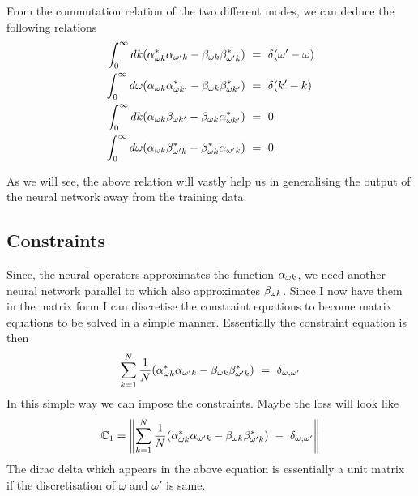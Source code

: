 
From the commutation relation of the two different modes, we can deduce the following relations
\begin{equation}\label{eq:constraints}
    \begin{aligned}
        \int_0^{\infty}dk (\alpha_{\omega k}^*\alpha_{\omega'k}-\beta_{\omega k}\beta_{\omega'k}^*)~&=~\delta(\omega'-\omega)\\
        \int_0^{\infty}d\omega (\alpha_{\omega k}\alpha_{\omega k'}^*-\beta_{\omega k}\beta_{\omega k'}^*)~&=~\delta(k'-k)\\
        \int_0^{\infty}dk (\alpha_{\omega k}\beta_{\omega k'}-\beta_{\omega k}\alpha_{\omega k'}^*)~&=~0\\
        \int_0^{\infty}d\omega (\alpha_{\omega k}\beta_{\omega' k}^*-\beta_{\omega k}^*\alpha_{\omega'k})~&=~0\\
    \end{aligned}
\end{equation}

As we will see, the above relation will vastly help us in generalising the output of the neural network away from the training data.

\color{red}
\subsection{Constraints}

Since, the neural operators approximates the function $\alpha_{\omega k}$, we need another neural network parallel to which also approximates $\beta_{\omega k}$. Since I now have them in the matrix form I can discretise the constraint equations to become matrix equations to be solved in a simple manner. Essentially the constraint equation is then
\begin{eqnarray*}
    \sum_{k=1}^{N}\frac{1}{N}(\alpha_{\omega k}^*\alpha_{\omega' k}-\beta_{\omega k}\beta_{\omega' k}^*)~=~\delta_{\omega,\omega'}
\end{eqnarray*}
In this simple way we can impose the constraints. Maybe the loss will look like
\begin{equation}
   \mathbb{C}_1=\left\lVert\sum_{k=1}^{N}\frac{1}{N}(\alpha_{\omega k}^*\alpha_{\omega' k}-\beta_{\omega k}\beta_{\omega' k}^*)~-~\delta_{\omega,\omega'} \right\rVert
\end{equation}
The dirac delta which appears in the above equation is essentially a unit matrix if the discretisation of $\omega$ and $\omega'$ is same.

